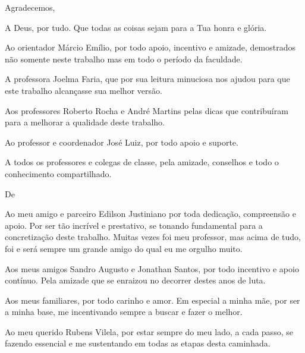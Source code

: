 \begin{agradecimentos}

Agradecemos,
\newline

\par A Deus, por tudo. Que todas as coisas sejam para a Tua honra e glória.

\par Ao orientador Márcio Emílio, por todo apoio, incentivo e amizade, demostrados não somente neste trabalho mas em todo o período da faculdade.

\par A professora Joelma Faria, que por sua leitura minuciosa nos ajudou para que este trabalho alcançasse sua melhor versão.

\par Aos professores Roberto Rocha e André Martins pelas dicas que contribuíram para a melhorar a qualidade deste trabalho.

\par Ao professor e coordenador José Luiz, por todo apoio e suporte.

\par A todos os professores e colegas de classe, pela amizade, conselhos e todo o conhecimento compartilhado.

\vspace*{\fill}
De \imprimirAutorUm
\newline

\par Ao meu amigo e parceiro Edilson Justiniano por toda dedicação, compreensão e apoio. Por ser tão incrível e prestativo, se tonando fundamental para a concretização deste trabalho. Muitas vezes foi meu professor, mas acima de tudo, foi e será sempre um grande amigo do qual eu me orgulho muito.

\par Aos meus amigos Sandro Augusto e Jonathan Santos, por todo incentivo e apoio contínuo. Pela amizade que se enraizou no decorrer destes anos de luta.

\par Aos meus familiares, por todo carinho e amor. Em especial a minha mãe, por ser a minha base, me incentivando sempre a buscar e fazer o melhor. 

\par Ao meu querido Rubens Vilela, por estar sempre do meu lado, a cada passo, se fazendo essencial e me sustentando em todas as etapas desta caminhada.


\end{agradecimentos}
